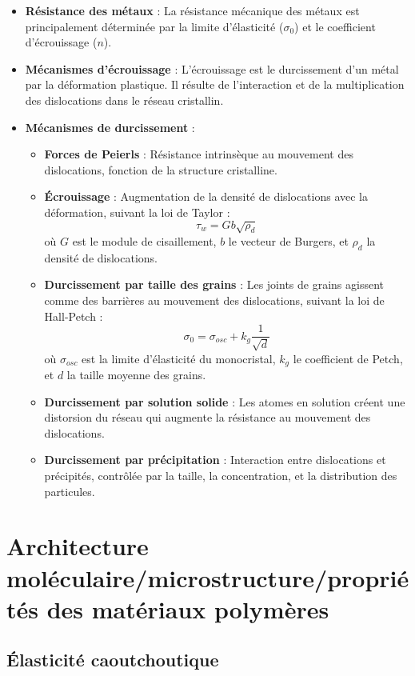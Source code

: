 \documentclass{article}
\begin{document}
    \begin{itemize}
        \item \textbf{Résistance des métaux} : La résistance mécanique des métaux est principalement déterminée par la limite d'élasticité ($\sigma_0$) et le coefficient d'écrouissage ($n$).
        \item \textbf{Mécanismes d'écrouissage} : L'écrouissage est le durcissement d'un métal par la déformation plastique. Il résulte de l'interaction et de la multiplication des dislocations dans le réseau cristallin.
        \item \textbf{Mécanismes de durcissement} : 
        \begin{itemize}
            \item \textbf{Forces de Peierls} : Résistance intrinsèque au mouvement des dislocations, fonction de la structure cristalline.
            \item \textbf{Écrouissage} : Augmentation de la densité de dislocations avec la déformation, suivant la loi de Taylor :
            \[
            \tau_w = G b \sqrt{\rho_d}
            \]
            où $G$ est le module de cisaillement, $b$ le vecteur de Burgers, et $\rho_d$ la densité de dislocations.
            \item \textbf{Durcissement par taille des grains} : Les joints de grains agissent comme des barrières au mouvement des dislocations, suivant la loi de Hall-Petch :
            \[
            \sigma_0 = \sigma_{osc} + k_g \frac{1}{\sqrt{d}}
            \]
            où $\sigma_{osc}$ est la limite d'élasticité du monocristal, $k_g$ le coefficient de Petch, et $d$ la taille moyenne des grains.
            \item \textbf{Durcissement par solution solide} : Les atomes en solution créent une distorsion du réseau qui augmente la résistance au mouvement des dislocations.
            \item \textbf{Durcissement par précipitation} : Interaction entre dislocations et précipités, contrôlée par la taille, la concentration, et la distribution des particules.
        \end{itemize}
    \end{itemize}

\section{Architecture moléculaire/microstructure/propriétés des matériaux polymères}
    \subsection{Élasticité caoutchoutique}
    
\end{document}
